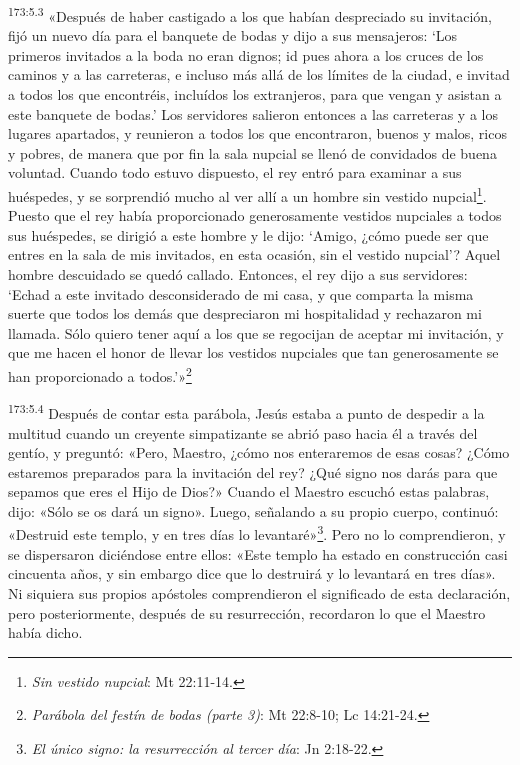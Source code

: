 \par 
\textsuperscript{173:5.3} «Después de haber castigado a los que habían despreciado su invitación, fijó un nuevo día para el banquete de bodas y dijo a sus mensajeros: `Los primeros invitados a la boda no eran dignos; id pues ahora a los cruces de los caminos y a las carreteras, e incluso más allá de los límites de la ciudad, e invitad a todos los que encontréis, incluídos los extranjeros, para que vengan y asistan a este banquete de bodas.' Los servidores salieron entonces a las carreteras y a los lugares apartados, y reunieron a todos los que encontraron, buenos y malos, ricos y pobres, de manera que por fin la sala nupcial se llenó de convidados de buena voluntad. Cuando todo estuvo dispuesto, el rey entró para examinar a sus huéspedes, y se sorprendió mucho al ver allí a un hombre sin vestido nupcial\footnote{\textit{Sin vestido nupcial}: Mt 22:11-14.}. Puesto que el rey había proporcionado generosamente vestidos nupciales a todos sus huéspedes, se dirigió a este hombre y le dijo: `Amigo, ¿cómo puede ser que entres en la sala de mis invitados, en esta ocasión, sin el vestido nupcial'? Aquel hombre descuidado se quedó callado. Entonces, el rey dijo a sus servidores: `Echad a este invitado desconsiderado de mi casa, y que comparta la misma suerte que todos los demás que despreciaron mi hospitalidad y rechazaron mi llamada. Sólo quiero tener aquí a los que se regocijan de aceptar mi invitación, y que me hacen el honor de llevar los vestidos nupciales que tan generosamente se han proporcionado a todos.'»\footnote{\textit{Parábola del festín de bodas (parte 3)}: Mt 22:8-10; Lc 14:21-24.}

\par 
\textsuperscript{173:5.4} Después de contar esta parábola, Jesús estaba a punto de despedir a la multitud cuando un creyente simpatizante se abrió paso hacia él a través del gentío, y preguntó: «Pero, Maestro, ¿cómo nos enteraremos de esas cosas? ¿Cómo estaremos preparados para la invitación del rey? ¿Qué signo nos darás para que sepamos que eres el Hijo de Dios?» Cuando el Maestro escuchó estas palabras, dijo: «Sólo se os dará un signo». Luego, señalando a su propio cuerpo, continuó: «Destruid este templo, y en tres días lo levantaré»\footnote{\textit{El único signo: la resurrección al tercer día}: Jn 2:18-22.}. Pero no lo comprendieron, y se dispersaron diciéndose entre ellos: «Este templo ha estado en construcción casi cincuenta años, y sin embargo dice que lo destruirá y lo levantará en tres días». Ni siquiera sus propios apóstoles comprendieron el significado de esta declaración, pero posteriormente, después de su resurrección, recordaron lo que el Maestro había dicho.

